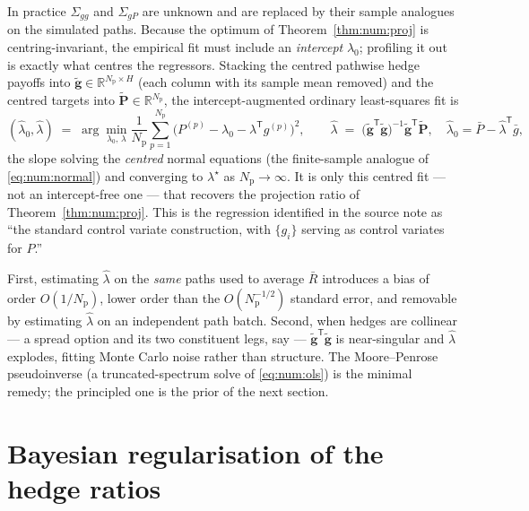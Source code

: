In practice $\Sigma_{gg}$ and $\Sigma_{gP}$ are unknown and are replaced by
their sample analogues on the simulated paths. Because the optimum of
Theorem~\ref{thm:num:proj} is centring-invariant, the empirical fit must include
an \emph{intercept} $\lambda_0$; profiling it out is exactly what centres the
regressors. Stacking the centred pathwise hedge payoffs into
$\tilde{\mathbf g} \in \mathbb{R}^{N_{\mathrm{p}}\times H}$ (each column with its sample
mean removed) and the centred targets into
$\tilde{\mathbf P} \in \mathbb{R}^{N_{\mathrm{p}}}$, the intercept-augmented ordinary
least-squares fit is
\begin{equation}\label{eq:num:ols}
   (\hat\lambda_0,\hat\lambda)
   \;=\;
   \arg\min_{\lambda_0,\,\lambda}\frac{1}{N_{\mathrm{p}}}\sum_{p=1}^{N_{\mathrm{p}}}
     \bigl(P^{(p)} - \lambda_0 - \lambda^{\mathsf T} g^{(p)}\bigr)^2,
   \qquad
   \hat\lambda
   \;=\;
   \bigl(\tilde{\mathbf g}^{\mathsf T}\tilde{\mathbf g}\bigr)^{-1}
   \tilde{\mathbf g}^{\mathsf T}\tilde{\mathbf P},
   \quad
   \hat\lambda_0 = \bar P - \hat\lambda^{\mathsf T}\bar g,
\end{equation}
the slope solving the \emph{centred} normal equations (the finite-sample
analogue of \eqref{eq:num:normal}) and converging to $\lambda^\star$ as
$N_{\mathrm{p}}\to\infty$. It is only this centred fit --- not an intercept-free one ---
that recovers the projection ratio of Theorem~\ref{thm:num:proj}. This is the
regression identified in the source note as ``the standard control variate
construction, with $\{g_i\}$ serving as control variates for $P$.''

\begin{remark}\label{rem:num:caveats}
First, estimating $\hat\lambda$ on the \emph{same} paths used to average $\bar R$
introduces a bias of order $O(1/N_{\mathrm{p}})$, lower order than the $O(N_{\mathrm{p}}^{-1/2})$
standard error, and removable by estimating $\hat\lambda$ on an independent path
batch. Second, when hedges are collinear --- a spread option and its two
constituent legs, say --- $\tilde{\mathbf g}^{\mathsf T}\tilde{\mathbf g}$ is
near-singular and $\hat\lambda$ explodes, fitting Monte Carlo noise rather than
structure. The Moore--Penrose pseudoinverse (a truncated-spectrum solve of
\eqref{eq:num:ols}) is the minimal remedy; the principled one is the prior of
the next section.
\end{remark}

\section{Bayesian regularisation of the hedge ratios}
\label{sec:num:bayes}

